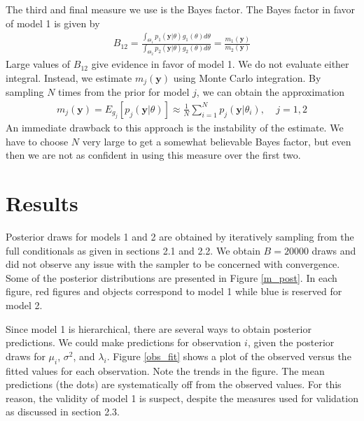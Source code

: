 \documentclass{asaproc}
\newcommand{\m}[1]{\mathbf{\bm{#1}}}
\begin{document}
The third and final measure we use is the Bayes factor. The Bayes factor in favor of model 1 is given by
\begin{eqnarray*}
B_{12}=\frac{\int_{\Theta_1}p_1(\m{y}|\theta)g_1(\theta)d\theta}{\int_{\Theta_2}p_2(\m{y}|\theta)g_2(\theta)d\theta} = \frac{m_1(\m{y})}{m_2(\m{y})}
\end{eqnarray*}
Large values of $B_{12}$ give evidence in favor of model 1. We do not evaluate either integral. Instead, we estimate $m_j(\m{y})$ using Monte Carlo integration. By sampling $N$ times from the prior for model $j$, we can obtain the approximation
\begin{eqnarray*}
m_j(\m{y})=E_{g_j}[p_j(\m{y}|\theta)] \approx \frac{1}{N}\sum_{i=1}^Np_j(\m{y}|\theta_i),~~~~~j=1,2
\end{eqnarray*}
An immediate drawback to this approach is the instability of the estimate. We have to choose $N$ very large to get a somewhat believable Bayes factor, but even then we are not as confident in using this measure over the first two.

\section{Results}

Posterior draws for models 1 and 2 are obtained by iteratively sampling from the full conditionals as given in sections 2.1 and 2.2. We obtain $B=20000$ draws and did not observe any issue with the sampler to be concerned with convergence. Some of the posterior distributions are presented in Figure \ref{m_post}.  In each figure, red figures and objects correspond to model 1 while blue is reserved for model 2.

Since model 1 is hierarchical, there are several ways to obtain posterior predictions. We could make predictions for observation $i$, given the posterior draws for $\mu_i$, $\sigma^2$, and $\lambda_i$. Figure \ref{obs_fit} shows a plot of the observed versus the fitted values for each observation. Note the trends in the figure. The mean predictions (the dots) are systematically off from the observed values. For this reason, the validity of model 1 is suspect, despite the measures used for validation as discussed in section 2.3.
\end{document}
